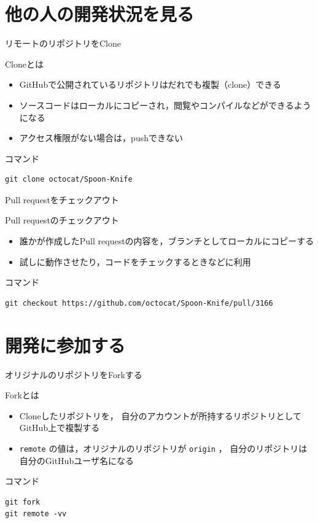 \documentclass[t, aspectratio=169]{beamer}
\begin{document}
\section{他の人の開発状況を見る}
\label{sec-4-1}
\begin{frame}[fragile,label=sec-4-1-1]{リモートのリポジトリをClone}
 \begin{block}{Cloneとは}
\begin{itemize}
\item GitHubで公開されているリポジトリはだれでも複製（clone）できる
\item ソースコードはローカルにコピーされ，閲覧やコンパイルなどができるようになる
\item アクセス権限がない場合は，pushできない
\end{itemize}
\end{block}
\begin{block}{コマンド}
\begin{verbatim}
git clone octocat/Spoon-Knife
\end{verbatim}
\end{block}
\end{frame}

\begin{frame}[fragile,label=sec-4-1-2]{Pull requestをチェックアウト}
 \begin{block}{Pull requestのチェックアウト}
\begin{itemize}
\item 誰かが作成したPull requestの内容を，ブランチとしてローカルにコピーする
\item 試しに動作させたり，コードをチェックするときなどに利用
\end{itemize}
\end{block}
\begin{block}{コマンド}
\begin{verbatim}
git checkout https://github.com/octocat/Spoon-Knife/pull/3166
\end{verbatim}
\end{block}
\end{frame}

\section{開発に参加する}
\label{sec-4-2}
\begin{frame}[fragile,label=sec-4-2-1]{オリジナルのリポジトリをForkする}
 \begin{block}{Forkとは}
\begin{itemize}
\item Cloneしたリポジトリを，
自分のアカウントが所持するリポジトリとして
GitHub上で複製する
\item \texttt{remote} の値は，オリジナルのリポジトリが \texttt{origin} ，
自分のリポジトリは自分のGitHubユーザ名になる
\end{itemize}
\end{block}
\begin{block}{コマンド}
\begin{verbatim}
git fork
git remote -vv
\end{verbatim}
\end{block}
\end{frame}
\end{document}
